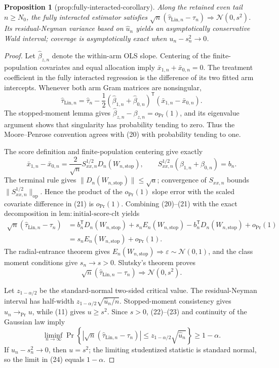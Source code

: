 \documentclass{article}
\newtheorem{proposition}{Proposition}
\begin{document}
\begin{proposition}[prop:fully-interacted-corollary]\label{prop:fully-interacted-corollary}
Along the retained even tail \(n\ge N_0\), the fully interacted estimator satisfies \(\sqrt n(\widehat\tau_{\mathrm{Lin},n}-\tau_n)\Rightarrow\mathcal N(0,s^2)\). Its residual-Neyman variance based on \(\widehat u_n\) yields an asymptotically conservative Wald interval; coverage is asymptotically exact when \(u_n-s_n^2\to0\).
\end{proposition}
\begin{proof}
Let \(\widehat\beta_{z,n}\) denote the within-arm OLS slope.  Centering of the finite-population covariates and equal allocation imply \(\bar x_{1,n}+\bar x_{0,n}=0\).  The treatment coefficient in the fully interacted regression is the difference of its two fitted arm intercepts.  Whenever both arm Gram matrices are nonsingular,
\[
 \widehat\tau_{\mathrm{Lin},n}
 =\widehat\tau_n-\frac12(\widehat\beta_{1,n}+\widehat\beta_{0,n})^{\mathsf T}
 (\bar x_{1,n}-\bar x_{0,n}). \tag{20}
\]
The stopped-moment lemma gives \(\widehat\beta_{z,n}-\beta_{z,n}=o_{\Pr}(1)\), and its eigenvalue argument shows that singularity has probability tending to zero.  Thus the Moore--Penrose convention agrees with (20) with probability tending to one.

The score definition and finite-population centering give exactly
\[
 \bar x_{1,n}-\bar x_{0,n}
 =\frac2{\sqrt n}S_{xx,n}^{1/2}D_n(W_{n,\mathrm{stop}}),
 \qquad
 S_{xx,n}^{1/2}(\beta_{1,n}+\beta_{0,n})=b_n. \tag{21}
\]
The terminal rule gives \(\|D_n(W_{n,\mathrm{stop}})\|\le\sqrt a\); convergence of \(S_{xx,n}\) bounds \(\|S_{xx,n}^{1/2}\|_{\mathrm{op}}\).  Hence the product of the \(o_{\Pr}(1)\) slope error with the scaled covariate difference in (21) is \(o_{\Pr}(1)\).  Combining (20)--(21) with the exact decomposition in \(\mathrm{lem{:}initial\mbox{-}score\mbox{-}clt}\) yields
\[
 \begin{aligned}
 \sqrt n(\widehat\tau_{\mathrm{Lin},n}-\tau_n)
 &=b_n^{\mathsf T}D_n(W_{n,\mathrm{stop}})
   +s_nE_n(W_{n,\mathrm{stop}})
   -b_n^{\mathsf T}D_n(W_{n,\mathrm{stop}})+o_{\Pr}(1)\\
 &=s_nE_n(W_{n,\mathrm{stop}})+o_{\Pr}(1). \tag{22}
 \end{aligned}
\]
The radial-entrance theorem gives \(E_n(W_{n,\mathrm{stop}})\Rightarrow\varepsilon\sim\mathcal N(0,1)\), and the class moment conditions give \(s_n\to s>0\).  Slutsky's theorem proves
\[
 \sqrt n(\widehat\tau_{\mathrm{Lin},n}-\tau_n)
 \Rightarrow\mathcal N(0,s^2). \tag{23}
\]

Let \(z_{1-\alpha/2}\) be the standard-normal two-sided critical value.  The residual-Neyman interval has half-width \(z_{1-\alpha/2}\sqrt{\widehat u_n/n}\).  Stopped-moment consistency gives \(\widehat u_n\to_{\Pr}u\), while (11) gives \(u\ge s^2\).  Since \(s>0\), (22)--(23) and continuity of the Gaussian law imply
\[
 \liminf_{n\to\infty}\Pr\!\left\{
 |\sqrt n(\widehat\tau_{\mathrm{Lin},n}-\tau_n)|
 \le z_{1-\alpha/2}\sqrt{\widehat u_n}\right\}\ge1-\alpha. \tag{24}
\]
If \(u_n-s_n^2\to0\), then \(u=s^2\); the limiting studentized statistic is standard normal, so the limit in (24) equals \(1-\alpha\).
\end{proof}
\end{document}
